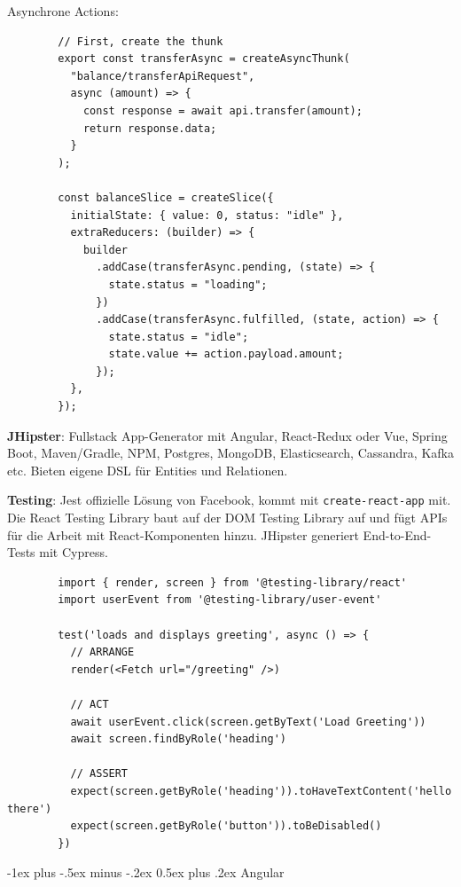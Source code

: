 \documentclass[10pt,landscape]{article}
\makeatletter
\renewcommand{\section}{\@startsection{section}{1}{0mm}%
{-1ex plus -.5ex minus -.2ex}%
{0.5ex plus .2ex}%
{\normalfont\large\bfseries}}
\makeatother
\begin{document}
\begin{multicols}{3}
        Asynchrone Actions:

        \begin{lstlisting}
        // First, create the thunk
        export const transferAsync = createAsyncThunk(
          "balance/transferApiRequest",
          async (amount) => {
            const response = await api.transfer(amount);
            return response.data;
          }
        );

        const balanceSlice = createSlice({
          initialState: { value: 0, status: "idle" },
          extraReducers: (builder) => {
            builder
              .addCase(transferAsync.pending, (state) => {
                state.status = "loading";
              })
              .addCase(transferAsync.fulfilled, (state, action) => {
                state.status = "idle";
                state.value += action.payload.amount;
              });
          },
        });
        \end{lstlisting}

        \textbf{JHipster}: Fullstack App-Generator mit Angular, React-Redux oder Vue, Spring Boot, Maven/Gradle, NPM, Postgres, MongoDB, Elasticsearch, Cassandra, Kafka etc.
        Bieten eigene DSL für Entities und Relationen.

        \textbf{Testing}: Jest offizielle Lösung von Facebook, kommt mit \lstinline{create-react-app} mit.
        Die React Testing Library baut auf der DOM Testing Library auf und fügt APIs für die Arbeit mit React-Komponenten hinzu.
        JHipster generiert End-to-End-Tests mit Cypress.

        \begin{lstlisting}
        import { render, screen } from '@testing-library/react'
        import userEvent from '@testing-library/user-event'

        test('loads and displays greeting', async () => {
          // ARRANGE
          render(<Fetch url="/greeting" />)

          // ACT
          await userEvent.click(screen.getByText('Load Greeting'))
          await screen.findByRole('heading')

          // ASSERT
          expect(screen.getByRole('heading')).toHaveTextContent('hello there')
          expect(screen.getByRole('button')).toBeDisabled()
        })
        \end{lstlisting}


        \section{Angular}


\end{multicols}
\end{document}
